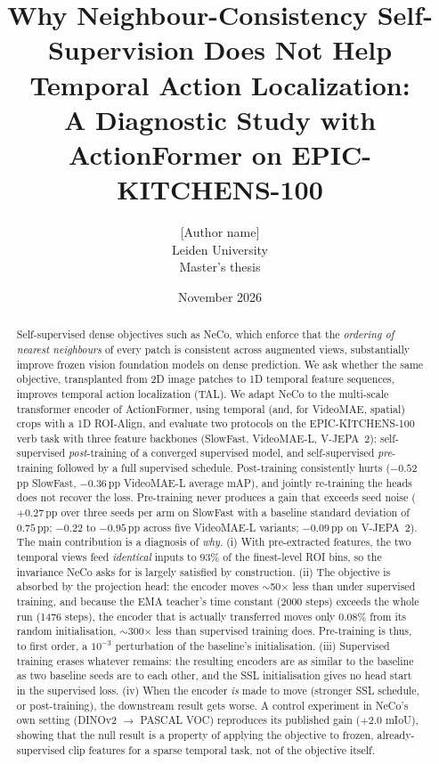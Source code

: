 \documentclass[10pt,a4paper]{article}
\title{\textbf{Why Neighbour-Consistency Self-Supervision Does Not Help\\Temporal Action Localization:\\A Diagnostic Study with ActionFormer on EPIC-KITCHENS-100}}
\author{[Author name] \\ \small Leiden University \\ \small Master's thesis}
\date{November 2026}
\newcommand{\pp}{\,pp}
\begin{document}
\maketitle

\begin{abstract}
\noindent
Self-supervised dense objectives such as NeCo, which enforce that the \emph{ordering of
nearest neighbours} of every patch is consistent across augmented views, substantially
improve frozen vision foundation models on dense prediction. We ask whether the same
objective, transplanted from 2D image patches to 1D temporal feature sequences, improves
temporal action localization (TAL). We adapt NeCo to the multi-scale transformer encoder
of ActionFormer, using temporal (and, for VideoMAE, spatial) crops with a 1D ROI-Align,
and evaluate two protocols on the EPIC-KITCHENS-100 verb task with three feature
backbones (SlowFast, VideoMAE-L, V-JEPA~2): self-supervised \emph{post}-training of a
converged supervised model, and self-supervised \emph{pre}-training followed by a full
supervised schedule. Post-training consistently hurts ($-0.52$\pp{} SlowFast, $-0.36$\pp{}
VideoMAE-L average mAP), and jointly re-training the heads does not recover the loss.
Pre-training never produces a gain that exceeds seed noise ($+0.27$\pp{} over three seeds
per arm on SlowFast with a baseline standard deviation of $0.75$\pp; $-0.22$ to $-0.95$\pp{}
across five VideoMAE-L variants; $-0.09$\pp{} on V-JEPA~2). The main contribution is a
diagnosis of \emph{why}. (i) With pre-extracted features, the two temporal views feed
\emph{identical} inputs to 93\% of the finest-level ROI bins, so the invariance NeCo asks
for is largely satisfied by construction. (ii) The objective is absorbed by the projection
head: the encoder moves $\sim$50$\times$ less than under supervised training, and because
the EMA teacher's time constant (2000 steps) exceeds the whole run (1476 steps), the
encoder that is actually transferred moves only 0.08\% from its random initialisation,
$\sim$300$\times$ less than supervised training does. Pre-training is thus, to first order,
a $10^{-3}$ perturbation of the baseline's initialisation. (iii) Supervised training
erases whatever remains: the resulting encoders are as similar to the baseline as two
baseline seeds are to each other, and the SSL initialisation gives no head start in the
supervised loss. (iv) When the encoder \emph{is} made to move (stronger SSL schedule,
or post-training), the downstream result gets worse. A control experiment in NeCo's own
setting (DINOv2 $\rightarrow$ PASCAL VOC) reproduces its published gain ($+2.0$ mIoU),
showing that the null result is a property of applying the objective to frozen,
already-supervised clip features for a sparse temporal task, not of the objective itself.
\end{abstract}
\end{document}
